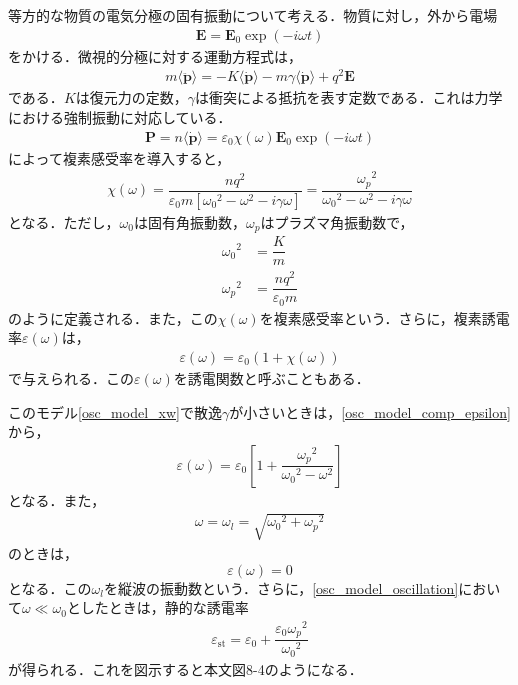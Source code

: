 等方的な物質の電気分極の固有振動について考える．物質に対し，外から電場
\begin{align}
  \boldsymbol{E}=\boldsymbol{E}_0\exp( - i\omega t)
\end{align}
をかける．微視的分極に対する運動方程式は，
\begin{align}
  m\langle\ddot{\boldsymbol{p}}\rangle = - K\langle\dot{\boldsymbol{p}}\rangle - m\gamma\langle\dot{\boldsymbol{p}}\rangle + q^2\boldsymbol{E}
  \label{osc_model_eom}
\end{align}
である．$K$は復元力の定数，$\gamma$は衝突による抵抗を表す定数である．これは力学における強制振動に対応している．
\begin{align}
  \boldsymbol{P} = n\langle\dot{\boldsymbol{p}}\rangle = \varepsilon_0\chi(\omega)\boldsymbol{E}_0\exp( -i\omega t)
\end{align}
によって複素感受率を導入すると，
\begin{align}
  \chi(\omega) = \dfrac{nq^2}{\varepsilon_0m[{\omega_0}^2 - \omega^2 - i\gamma\omega]} = \dfrac{{\omega_p}^2}{{\omega_0}^2 - \omega^2 - i\gamma\omega}
  \label{osc_model_xw}
\end{align}
となる．ただし，$\omega_0$は固有角振動数，$\omega_p$はプラズマ角振動数で，
\begin{align}
  {\omega_0}^2 &= \dfrac{K}{m}\\
  {\omega_p}^2 &= \dfrac{nq^2}{\varepsilon_0m}
\end{align}
のように定義される．また，この$\chi(\omega)$を複素感受率という．さらに，複素誘電率$\varepsilon(\omega)$は，
\begin{align}
  \varepsilon(\omega) = \varepsilon_0(1+\chi(\omega)) \label{osc_model_comp_epsilon}
\end{align}
で与えられる．この$\varepsilon(\omega)$を誘電関数と呼ぶこともある．

このモデル\eqref{osc_model_xw}で散逸$\gamma$が小さいときは，\eqref{osc_model_comp_epsilon}から，
\begin{align}
  \varepsilon(\omega) = \varepsilon_0\left[1+\dfrac{{\omega_p}^2}{{\omega_0}^2 - \omega^2}\right] \label{osc_model_oscillation}
\end{align}
となる．また，
\begin{align}
  \omega={\omega_l} = \sqrt{{\omega_0}^2+{\omega_p}^2}
\end{align}
のときは，
\[\varepsilon(\omega) = 0\]
となる．この$\omega_l$を縦波の振動数という．さらに，\eqref{osc_model_oscillation}において$\omega\ll\omega_0$としたときは，静的な誘電率
\begin{align}
  \varepsilon_{\text{st}}=\varepsilon_0+\dfrac{\varepsilon_0{\omega_p}^2}{{\omega_0}^2}\label{osc_model_st}
\end{align}
が得られる．これを図示すると本文図8-4のようになる．

